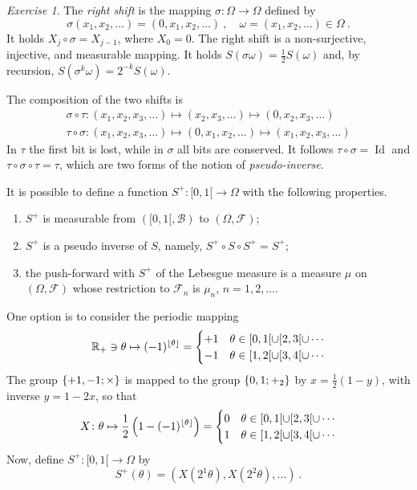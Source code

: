 \documentclass[12pt,a4paper]{amsart}
\DeclarePairedDelimiter\floor{\lfloor}{\rfloor}
\theoremstyle{plain}
\theoremstyle{definition}
\theoremstyle{remark}
\newtheorem{exercise}[theorem]{Exercise}
\begin{document}
\begin{exercise}
The \emph{right shift} is the mapping $\sigma \colon \Omega \to \Omega$
defined by 
\begin{equation*}
  \sigma(x_1,x_2,\dots) = (0,x_1,x_2,\dots) \ , \quad \omega =
  (x_1,x_2,\dots) \in \Omega \ .
\end{equation*}
It holds $X_j\circ \sigma = X_{j-1}$, where $X_0 = 0$. The right shift
is a non-surjective, injective, and measurable mapping. It holds
$S(\sigma \omega) = \frac12 S(\omega)$ and, by recursion, $S(\sigma^k
\omega) = 2^{-k} S(\omega)$. 

The composition of the two shifts is
\begin{gather*}
  \sigma \circ \tau \colon (x_1,x_2,x_3,\dots) \mapsto (x_2,x_3,\dots)
  \mapsto (0,x_2,x_3, \dots)
  \\
  \tau \circ \sigma \colon (x_1,x_2,x_3,\dots) \mapsto (0,x_1,x_2,\dots)
  \mapsto (x_1,x_2,x_3, \dots)
\end{gather*}
In $\tau$ the first bit is lost, while in $\sigma$ all
bits are conserved. It follows $\tau \circ \sigma = \operatorname{Id}$
and $\tau \circ \sigma \circ \tau = \tau$, which are two forms of the notion of
\emph{pseudo-inverse}.

It is possible to define a function $S^+ \colon [0,1[ \to \Omega$ with
the following properties.
\begin{enumerate}
\item $S^+$ is measurable from $([0,1[ ,
\mathcal B)$ to $(\Omega,\mathcal F)$; 
\item  $S^+$ is a pseudo inverse of
$S$, namely, $S^+ \circ S \circ S^+ = S^+$; 
\item the push-forward with $S^+$ of the Lebesgue measure is a measure $\mu$
on $(\Omega,\mathcal F)$ whose restriction to $\mathcal F_n$ is
$\mu_n$, $n=1,2,\dots$.
\end{enumerate}

One option is to consider the periodic mapping
\begin{equation*}
  \reals_+ \ni \theta \mapsto (-1)^{\floor*{\theta}}
  =
  \begin{cases}
   +1 & \theta \in [0,1[ \cup [2,3[ \cup \cdots \\
   -1 & \theta \in [1,2[ \cup [3,4[ \cup \cdots
  \end{cases}
\end{equation*}
The group $\left\{+1,-1;\times\right\}$ is mapped to the group $\left\{0,1;+_2\right\}$
by $x = \frac12(1-y)$, with inverse $y = 1-2x$, so that
\begin{equation*}
 X \colon  \theta \mapsto \frac12\left(1 - (-1)^{\floor \theta}\right)
  =
  \begin{cases}
   0 & \theta \in [0,1[ \cup [2,3[ \cup \cdots \\
   1 & \theta \in [1,2[ \cup [3,4[ \cup \cdots
  \end{cases}
\end{equation*}
Now, define $S^+ \colon [0,1[ \to \Omega$ by  
\begin{equation*}
  S^+(\theta) = \left(X(2^1 \theta), X(2^2 \theta), \dots \right) \ .
\end{equation*}


\end{exercise}
\end{document}
